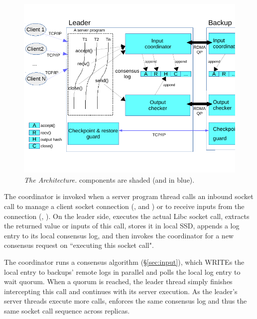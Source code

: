 \begin{figure}[t]
\centering
\vspace{-.15in}
\includegraphics[width=.48\textwidth]{figures/arch}
\vspace{-.50in}
\caption{{\em The \xxx Architecture.} \xxx components are shaded (and in
  blue).}
\vspace{-.15in}
  \label{fig:arch}
\end{figure}


The coordinator is invoked when a server program thread calls an inbound socket 
call to manage a client socket connection (\eg, \accept and \close) or to 
receive inputs from the connection (\eg, \recv). On the leader side, \xxx 
executes the actual Libc socket call, extracts the returned value or inputs of 
this call, stores it in local SSD, appends a log entry to its local consensus 
log, and then invokes the coordinator for a new consensus request on 
``executing this socket call".

The coordinator runs a consensus algorithm (\S\ref{sec:input}), which WRITEs 
the local entry to backups' remote logs in parallel and polls the local log 
entry to wait quorum. When a quorum is reached, the leader thread simply 
finishes intercepting this call and continues with its server execution. As 
the leader's server threads execute more calls, \xxx enforces the same 
consensus log and thus the same socket call sequence across replicas.



